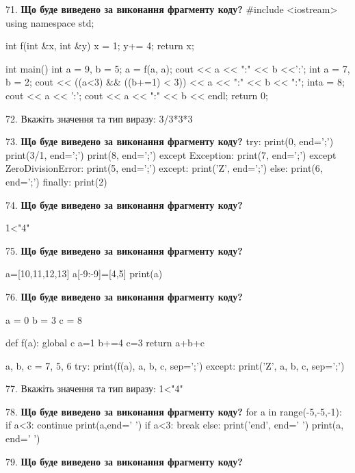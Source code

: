 \documentclass[11pt]{article}
\begin{document}
\par\vspace{5mm}
71. \textbf{Що буде виведено за виконання фрагменту коду?}
#include <iostream>
using namespace std;

int f(int &x, int &y){
    x = 1;
    y+= 4;
    return x;
}

int main(){
    int a = 9, b = 5;
    a = f(a, a);
    cout << a << ":" << b <<':';
    {
        int a = 7, b = 2;
        cout << ((a<3) && ((b+=1) < 3))
             << a << ":" << b << ":";
    }
    {
        inta = 8;
        cout << a << ':';
    }
    cout << a << ":" << b << endl;
    return 0;
}

\par\vspace{5mm}
72. 
Вкажіть значення та тип виразу:
3/3*3*3
\par\vspace{5mm}
73. \textbf{Що буде виведено за виконання фрагменту коду?}
try:
    print(0, end=';')
    print(3/1, end=';')
    print(8, end=';')
except Exception:
    print(7, end=';')
except ZeroDivisionError:
    print(5, end=';')
except:
    print('Z', end=';')
else:
    print(6, end=';')
finally:
    print(2)
\par\vspace{5mm}
74. \textbf{Що буде виведено за виконання фрагменту коду?}

1<"4"
\par\vspace{5mm}
75. \textbf{Що буде виведено за виконання фрагменту коду?}

a=[10,11,12,13]
a[-9:-9]=[4,5]
print(a)

\par\vspace{5mm}
76. \textbf{Що буде виведено за виконання фрагменту коду?}

a = 0
b = 3
c = 8

def f(a):
global c    a=1
    b+=4
    c=3
    return a+b+c

a, b, c = 7, 5, 6
try:
    print(f(a), a, b, c, sep=';')
except:
    print('Z', a, b, c, sep=';')
\par\vspace{5mm}
77. 
Вкажіть значення та тип виразу:
1<"4"
\par\vspace{5mm}
78. \textbf{Що буде виведено за виконання фрагменту коду?}
for a in range(-5,-5,-1):
    if a<3:
        continue
        print(a,end=' ')
    if a<3:
        break
else:
    print('end', end=' ')
print(a, end=' ')
\par\vspace{5mm}
79. \textbf{Що буде виведено за виконання фрагменту коду?}
\end{document}
